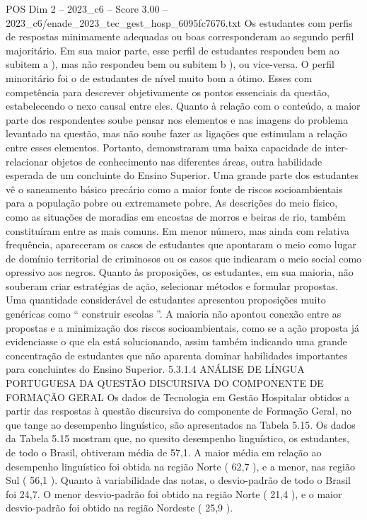 \begin{textsample}{POS Dim 2 – 2023\_c6 – Score 3.00 – 2023\_c6/enade\_2023\_tec\_gest\_hosp\_6095fc7676.txt}
Os estudantes com perfis de respostas minimamente adequadas ou boas corresponderam ao segundo perfil majoritário.
Em sua maior parte, esse perfil de estudantes respondeu bem ao subitem a ), mas não respondeu bem ou subitem b ), ou vice-versa.
O perfil minoritário foi o de estudantes de nível muito bom a ótimo.
Esses com competência para descrever objetivamente os pontos essenciais da questão, estabelecendo o nexo causal entre eles.
Quanto à relação com o conteúdo, a maior parte dos respondentes soube pensar nos elementos e nas imagens do problema levantado na questão, mas não soube fazer as ligações que estimulam a relação entre esses elementos.
Portanto, demonstraram uma baixa capacidade de inter-relacionar objetos de conhecimento nas diferentes áreas, outra habilidade esperada de um concluinte do Ensino Superior.
Uma grande parte dos estudantes vê o saneamento básico precário como a maior fonte de riscos socioambientais para a população pobre ou extremamete pobre.
As descrições do meio físico, como as situações de moradias em encostas de morros e beiras de rio, também constituíram entre as mais comuns.
Em menor número, mas ainda com relativa frequência, apareceram os casos de estudantes que apontaram o meio como lugar de domínio territorial de criminosos ou os casos que indicaram o meio social como opressivo aos negros.
Quanto às proposições, os estudantes, em sua maioria, não souberam criar estratégias de ação, selecionar métodos e formular propostas.
Uma quantidade considerável de estudantes apresentou proposições muito genéricas como “ construir escolas ”.
A maioria não apontou conexão entre as propostas e a minimização dos riscos socioambientais, como se a ação proposta já evidenciasse o que ela está solucionando, assim também indicando uma grande concentração de estudantes que não aparenta dominar habilidades importantes para concluintes do Ensino Superior. 5.3.1.4 ANÁLISE DE LÍNGUA PORTUGUESA DA QUESTÃO DISCURSIVA DO COMPONENTE DE FORMAÇÃO GERAL Os dados de Tecnologia em Gestão Hospitalar obtidos a partir das respostas à questão discursiva do componente de Formação Geral, no que tange ao desempenho linguístico, são apresentados na Tabela 5.15.
Os dados da Tabela 5.15 mostram que, no quesito desempenho linguístico, os estudantes, de todo o Brasil, obtiveram média de 57,1.
A maior média em relação ao desempenho linguístico foi obtida na região Norte ( 62,7 ), e a menor, nas região Sul ( 56,1 ).
Quanto à variabilidade das notas, o desvio-padrão de todo o Brasil foi 24,7.
O menor desvio-padrão foi obtido na região Norte ( 21,4 ), e o maior desvio-padrão foi obtido na região Nordeste ( 25,9 ).

\end{textsample}

